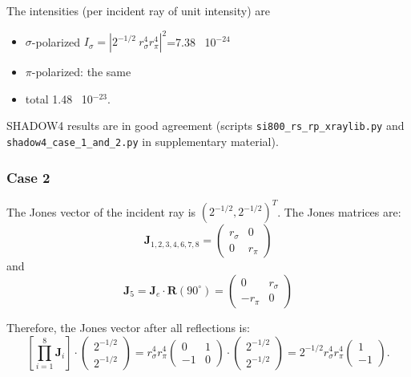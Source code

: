 \documentclass{iucr}
\begin{document}
The intensities (per incident ray of unit intensity) are
\begin{itemize}
    \item $\sigma$-polarized $I_\sigma=|2^{-1/2}~r_\sigma^4 r_\pi^4|^2$=7.38~ 10$^{-24}$
    \item $\pi$-polarized: the same
    \item total 1.48~ 10$^{-23}$.
\end{itemize}
SHADOW4 results are in good agreement (scripts {\tt si800\_rs\_rp\_xraylib.py} and {\tt shadow4\_case\_1\_and\_2.py} in supplementary material).

\subsubsection{Case 2}

The Jones vector of the incident ray is $(2^{-1/2},2^{-1/2})^T$.
The Jones matrices are: 
\begin{equation}\label{eq:Jcase2_S4}
\textbf{J}_{1,2,3,4,6,7,8}=
    \begin{pmatrix}
r_\sigma & 0\\
0& 
r_\pi
\end{pmatrix}
\end{equation}
and
\begin{equation}\label{eq:J5case2_S4}
\textbf{J}_{5}=\textbf{J}_e \cdot \textbf{R}(90^\circ)=
\begin{pmatrix}
0 & r_\sigma\\
-r_\pi& 0
\end{pmatrix}
\end{equation}

Therefore, the Jones vector after all reflections is:
\begin{equation}\label{eq:JVcase2_S4}
\left[ \prod_{i=1}^{8} \textbf{J}_i \right]
    \cdot
    \begin{pmatrix}
    2^{-1/2}\\2^{-1/2}
    \end{pmatrix}=
    r_\sigma^4 r_\pi^4
        \begin{pmatrix}
    0&1\\
    -1 & 0
    \end{pmatrix}
    \cdot
        \begin{pmatrix}
    2^{-1/2}\\2^{-1/2}
    \end{pmatrix}
    =
    2^{-1/2}r_\sigma^4 r_\pi^4
    \begin{pmatrix}
    1\\
    -1
    \end{pmatrix}.
\end{equation}
\end{document}
